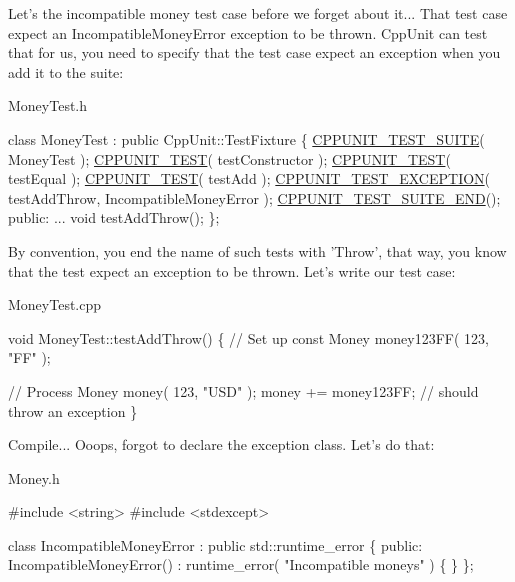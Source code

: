Let's the incompatible money test case before we forget about it... That test case expect an {\ttfamily Incompatible\+Money\+Error} exception to be thrown. Cpp\+Unit can test that for us, you need to specify that the test case expect an exception when you add it to the suite\+:

{\ttfamily Money\+Test.\+h} 
\begin{DoxyCode}
\textcolor{keyword}{class }MoneyTest : \textcolor{keyword}{public} CppUnit::TestFixture
\{
  \hyperlink{group___writing_test_fixture_gabe1e12200f40d6f25d60c1783c99da81}{CPPUNIT\_TEST\_SUITE}( MoneyTest );
  \hyperlink{group___writing_test_fixture_gaac9b03d898b207e1daf2f93867935a96}{CPPUNIT\_TEST}( testConstructor );
  \hyperlink{group___writing_test_fixture_gaac9b03d898b207e1daf2f93867935a96}{CPPUNIT\_TEST}( testEqual );
  \hyperlink{group___writing_test_fixture_gaac9b03d898b207e1daf2f93867935a96}{CPPUNIT\_TEST}( testAdd );
  \hyperlink{group___writing_test_fixture_gaca8eeb6f60714baade6cbfd185868c40}{CPPUNIT\_TEST\_EXCEPTION}( testAddThrow, IncompatibleMoneyError );
  \hyperlink{group___writing_test_fixture_ga601b2e1d525f3947b216e28c625abcb1}{CPPUNIT\_TEST\_SUITE\_END}();
\textcolor{keyword}{public}:
  ...
  \textcolor{keywordtype}{void} testAddThrow();
\};
\end{DoxyCode}


By convention, you end the name of such tests with {\ttfamily 'Throw'}, that way, you know that the test expect an exception to be thrown. Let's write our test case\+:

{\ttfamily Money\+Test.\+cpp} 
\begin{DoxyCode}
\textcolor{keywordtype}{void} 
MoneyTest::testAddThrow()
\{
  \textcolor{comment}{// Set up}
  \textcolor{keyword}{const} Money money123FF( 123, \textcolor{stringliteral}{"FF"} );

  \textcolor{comment}{// Process}
  Money money( 123, \textcolor{stringliteral}{"USD"} );
  money += money123FF;        \textcolor{comment}{// should throw an exception}
\}
\end{DoxyCode}


Compile... Ooops, forgot to declare the exception class. Let's do that\+:

{\ttfamily Money.\+h} 
\begin{DoxyCode}
\textcolor{preprocessor}{#include <string>}
\textcolor{preprocessor}{#include <stdexcept>}

\textcolor{keyword}{class }IncompatibleMoneyError : \textcolor{keyword}{public} std::runtime\_error
\{
\textcolor{keyword}{public}:
  IncompatibleMoneyError() : runtime\_error( \textcolor{stringliteral}{"Incompatible moneys"} )
  \{
  \}
\};
\end{DoxyCode}


